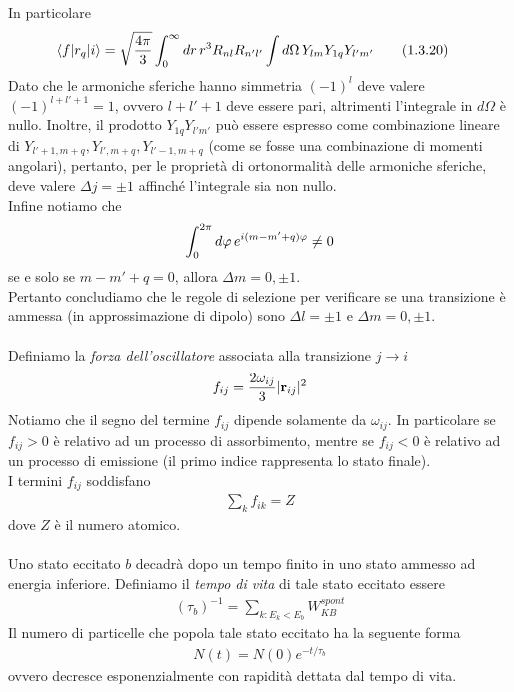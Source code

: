 \documentclass{article}
\begin{document}
In particolare 
\begin{align}
    \braket{f|r_q|i} &= \sqrt{\frac{4\pi}{3}}\int_0^\infty dr \, r^3 R_{nl}R_{n'l'} \int d\Omega \, Y_{lm}Y_{1q}Y_{l'm'} \tag{1.3.20}
\end{align}
Dato che le armoniche sferiche hanno simmetria $(-1)^{l}$ deve valere $(-1)^{l + l' + 1} = 1$, ovvero $l + l' + 1$ deve essere pari, altrimenti l'integrale in $d\Omega$ è nullo. Inoltre, il prodotto $Y_{1q}Y_{l'm'}$ può essere espresso come combinazione lineare di $Y_{l' + 1, m + q}, Y_{l', m + q}, Y_{l' - 1, m + q}$ (come se fosse una combinazione di momenti angolari), pertanto, per le proprietà di ortonormalità delle armoniche sferiche, deve valere $\Delta j = \pm 1$ affinché l'integrale sia non nullo. \\
Infine notiamo che 
\begin{align}
    \int_0^{2\pi}d\varphi \, e^{i(m - m' + q)\varphi} \neq 0 \notag
\end{align}
se e solo se $m - m' + q = 0$, allora $\Delta m = 0, \pm 1$. \\
Pertanto concludiamo che le regole di selezione per verificare se una transizione è ammessa (in approssimazione di dipolo) sono $\Delta l = \pm 1$ e $\Delta m = 0, \pm 1$. \\ \\
Definiamo la \textit{forza dell'oscillatore} associata alla transizione $j \rightarrow i$
\begin{align}
    f_{ij} = \frac{2\omega_{ij}}{3}|\mathbf{r}_{ij}|^2 \notag
\end{align}
Notiamo che il segno del termine $f_{ij}$ dipende solamente da $\omega_{ij}$. In particolare se $f_{ij} > 0$ è relativo ad un processo di assorbimento, mentre se $f_{ij} < 0$ è relativo ad un processo di emissione (il primo indice rappresenta lo stato finale). \\
I termini $f_{ij}$ soddisfano 
\begin{align}
    \sum_{k} f_{ik} = Z \tag{1.3.21}
\end{align}
dove $Z$ è il numero atomico. \\ \\
Uno stato eccitato $b$ decadrà dopo un tempo finito in uno stato ammesso ad energia inferiore. Definiamo il \textit{tempo di vita} di tale stato eccitato essere
\begin{align}
    (\tau_b)^{-1} = \sum_{k : E_k < E_b}W^{spont}_{KB} \tag{1.3.22}
\end{align}
Il numero di particelle che popola tale stato eccitato ha la seguente forma 
\begin{align}
    N(t) = N(0)e^{-t/\tau_b} \tag{1.3.23}
\end{align}
ovvero decresce esponenzialmente con rapidità dettata dal tempo di vita.
\end{document}
